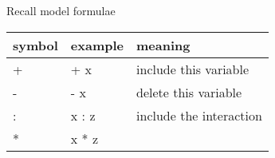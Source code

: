 \documentclass[
  ignorenonframetext,
]{beamer}
\begin{document}
\begin{frame}{Recall model formulae}
\protect\hypertarget{recall-model-formulae}{}

\begin{longtable}[]{@{}lll@{}}
\toprule
\begin{minipage}[b]{0.14\columnwidth}\raggedright
symbol\strut
\end{minipage} & \begin{minipage}[b]{0.24\columnwidth}\raggedright
example\strut
\end{minipage} & \begin{minipage}[b]{0.53\columnwidth}\raggedright
meaning\strut
\end{minipage}\tabularnewline
\midrule
\endhead
\begin{minipage}[t]{0.14\columnwidth}\raggedright
+\strut
\end{minipage} & \begin{minipage}[t]{0.24\columnwidth}\raggedright
+ x\strut
\end{minipage} & \begin{minipage}[t]{0.53\columnwidth}\raggedright
include this variable\strut
\end{minipage}\tabularnewline
\begin{minipage}[t]{0.14\columnwidth}\raggedright
-\strut
\end{minipage} & \begin{minipage}[t]{0.24\columnwidth}\raggedright
- x\strut
\end{minipage} & \begin{minipage}[t]{0.53\columnwidth}\raggedright
delete this variable\strut
\end{minipage}\tabularnewline
\begin{minipage}[t]{0.14\columnwidth}\raggedright
:\strut
\end{minipage} & \begin{minipage}[t]{0.24\columnwidth}\raggedright
x : z\strut
\end{minipage} & \begin{minipage}[t]{0.53\columnwidth}\raggedright
include the interaction\strut
\end{minipage}\tabularnewline
\begin{minipage}[t]{0.14\columnwidth}\raggedright
*\strut
\end{minipage} & \begin{minipage}[t]{0.24\columnwidth}\raggedright
x * z\strut
\end{minipage} & \begin{minipage}[t]{0.53\columnwidth}\raggedright

\end{minipage}
\end{longtable}
\end{frame}
\end{document}
